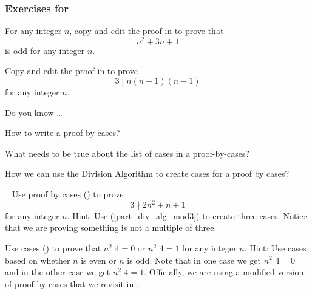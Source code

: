 
\subsubsection*{Exercises for  \subpffcases}

\begin{exer}[\exerP] %
\label{exer_quadratic_even}
   For any integer $n$, copy and edit the proof in  to prove that $$n^2+3n+1$$ is odd for any integer $n$.  
\end{exer}

\begin{exer}[\exerU] %
\label{exer_proof_cases_3divides} 
    Copy and edit the proof in  to prove $$3 \mid n(n+1)(n-1)$$ for any integer $n$.   
\end{exer}

\begin{exer}[\exerR] %
\label{exer_dyk_pff_cases}
    Do you know \ldots
        \begin{exerpart}
            \item How to write a proof by cases?
            \item What needs to be true about the list of cases in a proof-by-cases?
            \item How we can use the Division Algorithm to create cases for a proof by cases?
        \end{exerpart}
\end{exer}

\begin{exer}[\exerE] %
\label{exer_proof_cases_not_mult_three}
~
    Use proof by cases () to prove $$3 \nmid 2n^2 +n+1$$ for any integer $n$. Hint: Use  (\ref{part_div_alg_mod3}) to create three cases.  Notice that we are proving something is not a multiple of three.
\end{exer}

\begin{exer}[\exerE] %
\label{exer_proof_cases_square_mod4}
    Use cases () to prove that $n^2$  $4 = 0$ or $n^2$  $4 = 1$ for any integer $n$.  
    Hint: Use cases based on whether $n$ is even or $n$ is odd.  Note that in one case we get $n^2$  $4 = 0$ and in the other case we get $n^2$  $4 = 1$.  Officially, we are using a modified version of proof by cases that we revisit in .
\end{exer}

